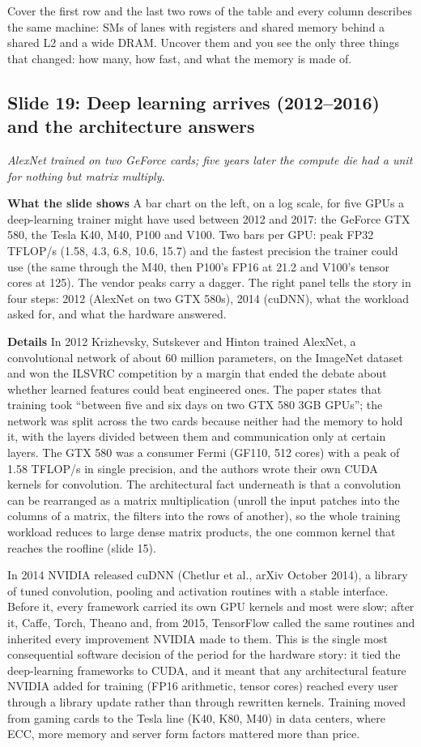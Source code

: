 \documentclass[11pt,letterpaper]{article}
\newcommand{\slide}[3]{%
  \subsection[Slide #1: #2]{Slide #1: #2}%
  {\color{muted}\itshape #3\par}\medskip}
\newcommand{\para}[1]{\medskip\noindent\textbf{#1}\quad}
\newenvironment{intuition}{\begin{tcolorbox}[intuitionbox]}{\end{tcolorbox}}
\begin{document}
\begin{intuition}
Cover the first row and the last two rows of the table and every column describes the same machine: SMs of lanes with registers and shared memory behind a shared L2 and a wide DRAM. Uncover them and you see the only three things that changed: how many, how fast, and what the memory is made of.
\end{intuition}

\slide{19}{Deep learning arrives (2012--2016) and the architecture answers}{AlexNet trained on two GeForce cards; five years later the compute die had a unit for nothing but matrix multiply.}

\para{What the slide shows} A bar chart on the left, on a log scale, for five GPUs a deep-learning trainer might have used between 2012 and 2017: the GeForce GTX 580, the Tesla K40, M40, P100 and V100. Two bars per GPU: peak FP32 TFLOP/s (1.58, 4.3, 6.8, 10.6, 15.7) and the fastest precision the trainer could use (the same through the M40, then P100's FP16 at 21.2 and V100's tensor cores at 125). The vendor peaks carry a dagger. The right panel tells the story in four steps: 2012 (AlexNet on two GTX 580s), 2014 (cuDNN), what the workload asked for, and what the hardware answered.

\para{Details} In 2012 Krizhevsky, Sutskever and Hinton trained AlexNet, a convolutional network of about 60 million parameters, on the ImageNet dataset and won the ILSVRC competition by a margin that ended the debate about whether learned features could beat engineered ones. The paper states that training took ``between five and six days on two GTX 580 3GB GPUs''; the network was split across the two cards because neither had the memory to hold it, with the layers divided between them and communication only at certain layers. The GTX 580 was a consumer Fermi (GF110, 512 cores) with a peak of 1.58 TFLOP/s in single precision, and the authors wrote their own CUDA kernels for convolution. The architectural fact underneath is that a convolution can be rearranged as a matrix multiplication (unroll the input patches into the columns of a matrix, the filters into the rows of another), so the whole training workload reduces to large dense matrix products, the one common kernel that reaches the roofline (slide 15).

In 2014 NVIDIA released cuDNN (Chetlur et al., arXiv October 2014), a library of tuned convolution, pooling and activation routines with a stable interface. Before it, every framework carried its own GPU kernels and most were slow; after it, Caffe, Torch, Theano and, from 2015, TensorFlow called the same routines and inherited every improvement NVIDIA made to them. This is the single most consequential software decision of the period for the hardware story: it tied the deep-learning frameworks to CUDA, and it meant that any architectural feature NVIDIA added for training (FP16 arithmetic, tensor cores) reached every user through a library update rather than through rewritten kernels. Training moved from gaming cards to the Tesla line (K40, K80, M40) in data centers, where ECC, more memory and server form factors mattered more than price.
\end{document}
